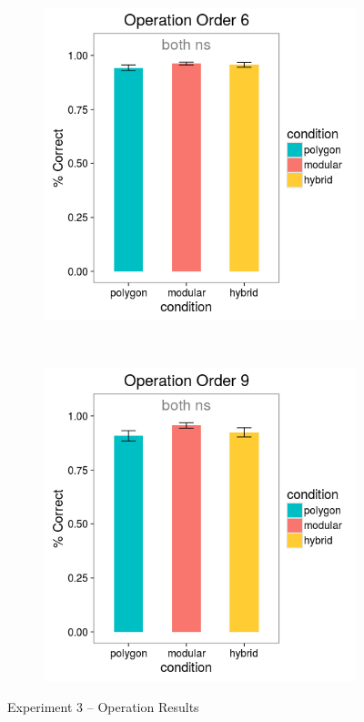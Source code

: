 \documentclass[11pt]{article}
\begin{document}
\begin{figure}[H]
\centering
\begin{subfigure}[c]{0.4\textwidth}
\centering
\includegraphics[width=\textwidth]{figures/3/op_6_r.png}
\end{subfigure}
~
\begin{subfigure}[c]{0.4\textwidth}
\centering
\includegraphics[width=\textwidth]{figures/3/op_9_r.png}
\end{subfigure}
\caption{Experiment 3 -- Operation Results}
\label{ex3_op}
\end{figure} 
\end{document}
